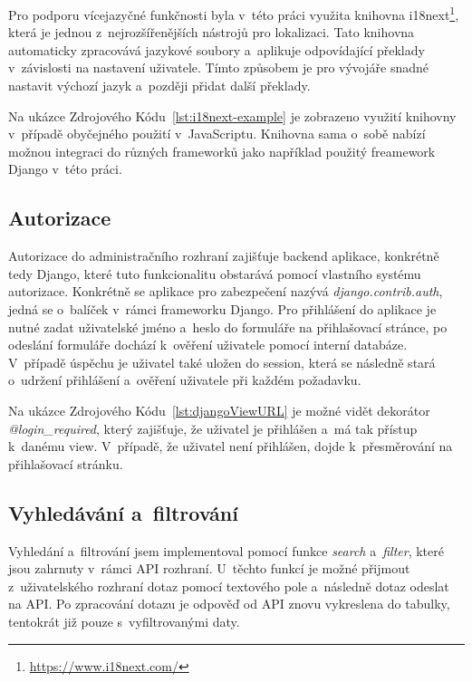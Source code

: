 Pro podporu vícejazyčné funkčnosti byla v~této práci využita knihovna i18next\footnote{\href{https://www.i18next.com/}{https://www.i18next.com/}}, která je jednou z~nejrozšířenějších nástrojů pro lokalizaci. Tato knihovna automaticky zpracovává jazykové soubory a~aplikuje odpovídající překlady v~závislosti na nastavení uživatele. Tímto způsobem je pro vývojáře snadné nastavit výchozí jazyk a~později přidat další překlady.



Na ukázce Zdrojového Kódu~\ref{lst:i18next-example} je zobrazeno využití knihovny v~případě obyčejného použití v~JavaScriptu. Knihovna sama o~sobě nabízí možnou integraci do různých frameworků jako například použitý freamework Django v~této práci.

\subsection{Autorizace}
\label{subsec:implementation-technologies-authorization}
Autorizace do administračního rozhraní zajišťuje backend aplikace, konkrétně tedy Django, které tuto funkcionalitu obstarává pomocí vlastního systému autorizace. Konkrétně se aplikace pro zabezpečení nazývá \textit{django.contrib.auth}, jedná se o~balíček v~rámci frameworku Django. Pro přihlášení do aplikace je nutné zadat uživatelské jméno a~heslo do formuláře na přihlašovací stránce, po odeslání formuláře dochází k~ověření uživatele pomocí interní databáze. V~případě úspěchu je uživatel také uložen do session, která se následně stará o~udržení přihlášení a~ověření uživatele při každém požadavku.

Na ukázce Zdrojového Kódu~\ref{lst:djangoViewURL} je možné vidět dekorátor \textit{@login\_required}, který zajišťuje, že uživatel je přihlášen a~má tak přístup k~danému view. V~případě, že uživatel není přihlášen, dojde k~přesměrování na přihlašovací stránku.



\subsection{Vyhledávání a~filtrování}
\label{subsec:implementation-technologies-search}
Vyhledání a~filtrování jsem implementoval pomocí funkce \textit{search} a~\textit{filter}, které jsou zahrnuty v~rámci API rozhraní. U~těchto funkcí je možné přijmout z~uživatelského rozhraní dotaz pomocí textového pole a~následně dotaz odeslat na API. Po zpracování dotazu je odpověď od API znovu vykreslena do tabulky, tentokrát již pouze s~vyfiltrovanými daty.

